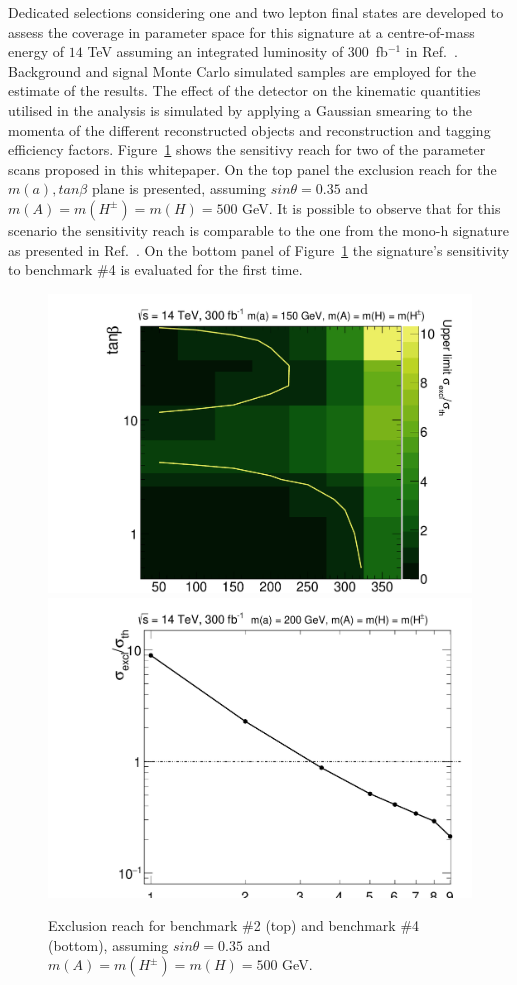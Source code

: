 Dedicated selections considering one and two lepton final states are
developed to assess the coverage in parameter space for this signature 
at a centre-of-mass energy of  $14$ TeV assuming an integrated
luminosity of 300~fb$^{-1}$ in Ref.~\cite{Pani:2017qyd}. 
Background and signal Monte Carlo simulated
samples are employed for the estimate of the results. The effect of the detector on the kinematic quantities
utilised in the analysis is simulated by applying a Gaussian smearing to the momenta
of  the different reconstructed objects and reconstruction and tagging efficiency factors.
Figure~\ref{DMHF:monotopres} shows the sensitivy reach for two of the
parameter scans proposed in this whitepaper. 
On the top panel the exclusion reach for the $m(a),tan\beta$ plane is
presented, assuming $sin\theta = 0.35$ and $m(A) = m(H^\pm) = m(H) =
500$ GeV. 
It is possible to observe that for this scenario the sensitivity reach
is comparable to the one from the mono-h signature as presented in
Ref.~\cite{Bauer:2017ota}. On the bottom panel of
Figure~\ref{DMHF:monotopres} the signature's sensitivity to benchmark \#4
 is evaluated for the first time. 

\begin{figure}
\centering
\includegraphics[width=.48\textwidth]{texinputs/04_grid/figures/DMHF/SRrec2l_2DSCAN_a}
\includegraphics[width=.47\textwidth]{texinputs/04_grid/figures/DMHF/SR2la_ULscan4}
\caption{Exclusion reach for  benchmark \#2 (top) and benchmark \#4 (bottom), 
assuming $sin\theta = 0.35$ and $m(A) = m(H^\pm) = m(H) = 500$ GeV.}
\label{DMHF:monotopres}
\end{figure}



